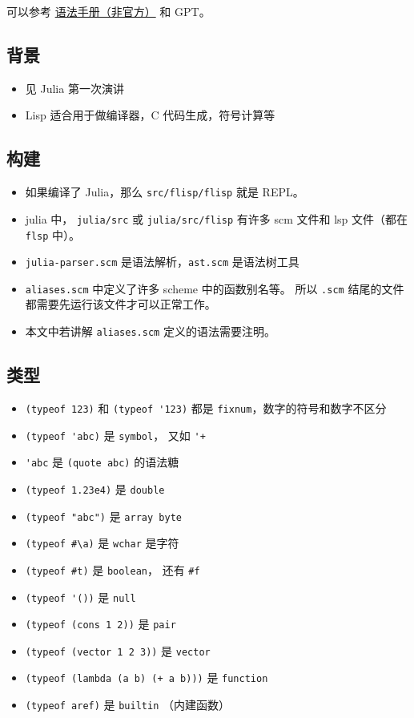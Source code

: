 
可以参考 \href{https://code.google.com/archive/p/femtolisp/wikis/Manual.wiki}{语法手册（非官方）} 和 GPT。

\subsection{背景}
\begin{itemize}
\item 见 Julia 第一次演讲
\item Lisp 适合用于做编译器，C 代码生成，符号计算等
\end{itemize}

\subsection{构建}
\begin{itemize}
\item 如果编译了 Julia，那么 \verb`src/flisp/flisp` 就是 REPL。
\item julia 中， \verb`julia/src` 或 \verb`julia/src/flisp` 有许多 scm 文件和 lsp 文件（都在 \verb`flsp` 中）。
\item \verb`julia-parser.scm` 是语法解析，\verb`ast.scm` 是语法树工具
\item \verb`aliases.scm` 中定义了许多 scheme 中的函数别名等。 所以 \verb`.scm` 结尾的文件都需要先运行该文件才可以正常工作。
\item 本文中若讲解 \verb`aliases.scm` 定义的语法需要注明。
\end{itemize}

\subsection{类型}
\begin{itemize}
\item \verb`(typeof 123)` 和 \verb`(typeof '123)` 都是 \verb`fixnum`，数字的符号和数字不区分
\item \verb`(typeof 'abc)` 是 \verb`symbol`， 又如 \verb`'+`
\item \verb`'abc` 是 \verb`(quote abc)` 的语法糖
\item \verb`(typeof 1.23e4)` 是 \verb`double`
\item \verb`(typeof "abc")` 是 \verb`array byte`
\item \verb`(typeof #\a)` 是 \verb`wchar` 是字符
\item \verb`(typeof #t)` 是 \verb`boolean`， 还有 \verb`#f`
\item \verb`(typeof '())` 是 \verb`null`
\item \verb`(typeof (cons 1 2))` 是 \verb`pair`
\item \verb`(typeof (vector 1 2 3))` 是 \verb`vector`
\item \verb`(typeof (lambda (a b) (+ a b)))` 是 \verb`function`
\item \verb`(typeof aref)` 是 \verb`builtin` （内建函数）
\end{itemize}

